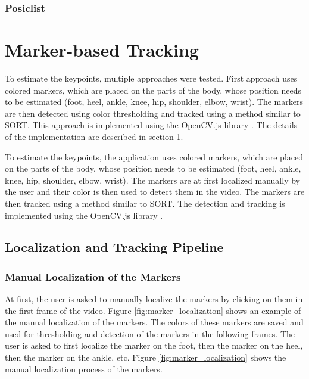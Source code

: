 \subsection{Posiclist}

\chapter{Marker-based Tracking}
\label{marker_based_tracking}
To estimate the keypoints, multiple approaches were tested. First approach uses colored markers, which are placed on the parts of the body, whose position needs to be estimated (foot, heel, ankle, knee, hip, shoulder, elbow, wrist). The markers are then detected using color thresholding and tracked using a method similar to SORT. This approach is implemented using the OpenCV.js library \cite{opencvjs}. The details of the implementation are described in section \ref{marker_based_tracking}.

To estimate the keypoints, the application uses colored markers, which are placed on the parts of the body, whose position needs to be estimated (foot, heel, ankle, knee, hip, shoulder, elbow, wrist). The markers are at first localized manually by the user and their color is then used to detect them in the video. The markers are then tracked using a method similar to SORT. The detection and tracking is implemented using the OpenCV.js library \cite{opencvjs}.

\section{Localization and Tracking Pipeline}

\subsection{Manual Localization of the Markers}
\label{manual_localization_of_the_markers}
At first, the user is asked to manually localize the markers by clicking on them in the first frame of the video. Figure \ref{fig:marker_localization} shows an example of the manual localization of the markers. The colors of these markers are saved and used for thresholding and detection of the markers in the following frames. The user is asked to first localize the marker on the foot, then the marker on the heel, then the marker on the ankle, etc. Figure \ref{fig:marker_localization} shows the manual localization process of the markers.

